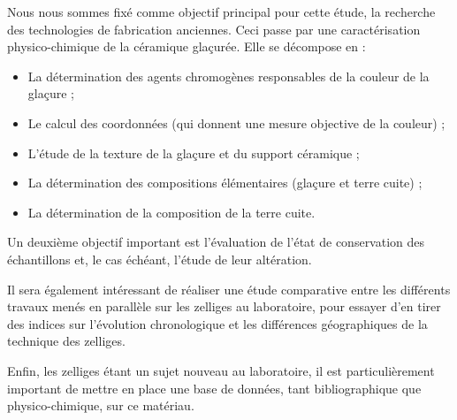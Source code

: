 Nous nous sommes fixé comme objectif principal pour cette étude, la 
recherche des technologies de fabrication anciennes. Ceci passe par 
une caractérisation physico-chimique de la céramique glaçurée. Elle 
se décompose en :

\begin{itemize}
  \item La détermination des agents chromogènes responsables de la 
        couleur de la glaçure ;
  \item Le calcul des coordonnées \trichros (qui donnent une mesure 
        objective de la couleur) ;
  \item L'étude de la texture de la glaçure et du support céramique ;
  \item La détermination des compositions élémentaires (glaçure et 
        terre cuite) ;
  \item La détermination de la composition \cristallo de la terre 
        cuite.
\end{itemize}

Un deuxième objectif important est l'évaluation de l'état de 
conservation des échantillons et, le cas échéant, l'étude de leur 
altération.

Il sera également intéressant de réaliser une étude comparative 
entre les différents travaux menés en parallèle sur les zelliges au 
laboratoire, pour essayer d'en tirer des indices sur l'évolution 
chronologique et les différences géographiques de la technique des 
zelliges.

Enfin, les zelliges étant un sujet nouveau au laboratoire, il est 
particulièrement important de mettre en place une base de données, 
tant bibliographique que physico-chimique, sur ce matériau.
